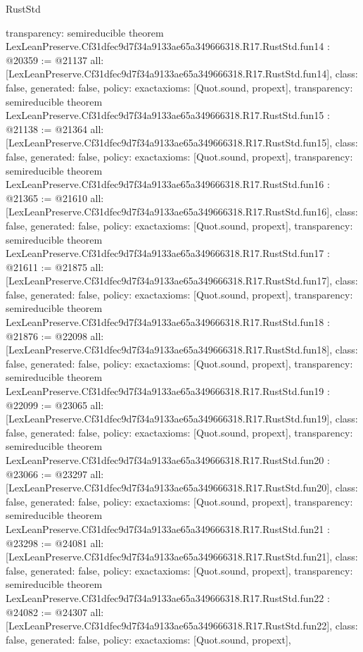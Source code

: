 \begin{lexlean}{RustStd}
\begin{coremodule}
{  transparency: semireducible
}
theorem LexLeanPreserve.Cf31dfec9d7f34a9133ae65a349666318.R17.RustStd.fun14 : @20359 := @21137 {
  all: [LexLeanPreserve.Cf31dfec9d7f34a9133ae65a349666318.R17.RustStd.fun14],
  class: false,
  generated: false,
  policy: exact{axioms: [Quot.sound, propext]},
  transparency: semireducible
}
theorem LexLeanPreserve.Cf31dfec9d7f34a9133ae65a349666318.R17.RustStd.fun15 : @21138 := @21364 {
  all: [LexLeanPreserve.Cf31dfec9d7f34a9133ae65a349666318.R17.RustStd.fun15],
  class: false,
  generated: false,
  policy: exact{axioms: [Quot.sound, propext]},
  transparency: semireducible
}
theorem LexLeanPreserve.Cf31dfec9d7f34a9133ae65a349666318.R17.RustStd.fun16 : @21365 := @21610 {
  all: [LexLeanPreserve.Cf31dfec9d7f34a9133ae65a349666318.R17.RustStd.fun16],
  class: false,
  generated: false,
  policy: exact{axioms: [Quot.sound, propext]},
  transparency: semireducible
}
theorem LexLeanPreserve.Cf31dfec9d7f34a9133ae65a349666318.R17.RustStd.fun17 : @21611 := @21875 {
  all: [LexLeanPreserve.Cf31dfec9d7f34a9133ae65a349666318.R17.RustStd.fun17],
  class: false,
  generated: false,
  policy: exact{axioms: [Quot.sound, propext]},
  transparency: semireducible
}
theorem LexLeanPreserve.Cf31dfec9d7f34a9133ae65a349666318.R17.RustStd.fun18 : @21876 := @22098 {
  all: [LexLeanPreserve.Cf31dfec9d7f34a9133ae65a349666318.R17.RustStd.fun18],
  class: false,
  generated: false,
  policy: exact{axioms: [Quot.sound, propext]},
  transparency: semireducible
}
theorem LexLeanPreserve.Cf31dfec9d7f34a9133ae65a349666318.R17.RustStd.fun19 : @22099 := @23065 {
  all: [LexLeanPreserve.Cf31dfec9d7f34a9133ae65a349666318.R17.RustStd.fun19],
  class: false,
  generated: false,
  policy: exact{axioms: [Quot.sound, propext]},
  transparency: semireducible
}
theorem LexLeanPreserve.Cf31dfec9d7f34a9133ae65a349666318.R17.RustStd.fun20 : @23066 := @23297 {
  all: [LexLeanPreserve.Cf31dfec9d7f34a9133ae65a349666318.R17.RustStd.fun20],
  class: false,
  generated: false,
  policy: exact{axioms: [Quot.sound, propext]},
  transparency: semireducible
}
theorem LexLeanPreserve.Cf31dfec9d7f34a9133ae65a349666318.R17.RustStd.fun21 : @23298 := @24081 {
  all: [LexLeanPreserve.Cf31dfec9d7f34a9133ae65a349666318.R17.RustStd.fun21],
  class: false,
  generated: false,
  policy: exact{axioms: [Quot.sound, propext]},
  transparency: semireducible
}
theorem LexLeanPreserve.Cf31dfec9d7f34a9133ae65a349666318.R17.RustStd.fun22 : @24082 := @24307 {
  all: [LexLeanPreserve.Cf31dfec9d7f34a9133ae65a349666318.R17.RustStd.fun22],
  class: false,
  generated: false,
  policy: exact{axioms: [Quot.sound, propext]},
}
\end{coremodule}
\end{lexlean}
